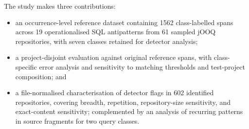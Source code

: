 The study makes three contributions:

\begin{itemize}
    \item an occurrence-level reference dataset containing \num{1562} class-labelled spans across 19 operationalised SQL antipatterns from 61 sampled jOOQ repositories, with seven classes retained for detector analysis;
    \item a project-disjoint evaluation against original reference spans, with class-specific error analysis and sensitivity to matching thresholds and test-project composition; and
    \item a file-normalised characterisation of detector flags in 602 identified repositories, covering breadth, repetition, repository-size sensitivity, and exact-content sensitivity; complemented by an analysis of recurring patterns in source fragments for two query classes.
\end{itemize}
